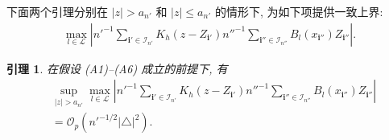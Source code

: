 \documentclass[a4paper,openay,14pt]{ctexbook}
\newtheorem{lem}{引理}
\numberwithin{equation}{section}
\numberwithin{lem}{section}
\begin{document}
下面两个引理分别在 $\vert z\vert > a_{n'}$ 和 $\vert z\vert \le a_{n'}$ 的情形下,
为如下项提供一致上界:
\begin{align*}
        \max_{l\in\mathcal{L}}\left\vert n'^{-1}\sum_{\mathbf{i}'\in\mathcal{I}_{n'}}K_h(z-Z_{\mathbf{i}'})n''^{-1}\sum_{\mathbf{i}''\in\mathcal{I}_{n''}}B_{l}\left(x_{\mathbf{i}''}\right)Z_{\mathbf{i}''}\right\vert.
\end{align*}
\begin{lem} \label{Lemma:KB1}
    在假设 (A1)--(A6) 成立的前提下, 有
    \begin{align*}
        &\sup_{\vert z\vert > a_{n'}}\max_{l\in\mathcal{L}}\left\vert n'^{-1}\sum_{\mathbf{i}'\in\mathcal{I}_{n'}}K_h(z-Z_{\mathbf{i}'})n''^{-1}\sum_{\mathbf{i}''\in\mathcal{I}_{n''}}B_{l}\left(x_{\mathbf{i}''}\right)Z_{\mathbf{i}''}\right\vert\\
        &={\scriptstyle{\mathcal{O}}}_p\left(n'^{-1/2}\vert\triangle\vert^2\right).
    \end{align*}
\end{lem}
\end{document}
